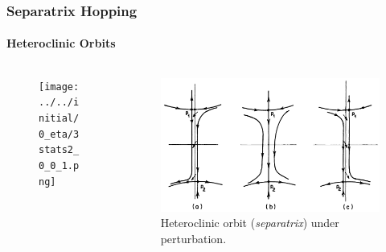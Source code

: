 \documentclass[dvipsnames]{beamer}
\begin{document}
\begin{frame}
    \frametitle{Separatrix Hopping}
    \framesubtitle{Heteroclinic Orbits}

    \begin{columns}
        \begin{column}{0.47\textwidth}
            \begin{figure}[t]
                \centering
                \texttt{[image: ../../initial/0\_eta/3stats2\_0\_0\_1.png]}
            \end{figure}
        \end{column}
        \begin{column}{0.47\textwidth}
            \begin{figure}[t]
                \centering
                \includegraphics[width=\textwidth]{../plots/heteroclinic.png}
                \caption{Heteroclinic orbit (\emph{separatrix}) under perturbation.}
            \end{figure}
        \end{column}
    \end{columns}
\end{frame}
\end{document}
